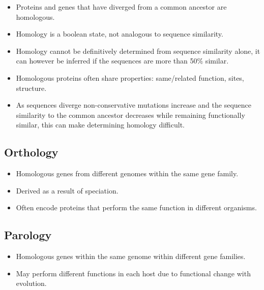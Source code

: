 \documentclass[a4paper]{article}
\begin{document}
\begin{itemize}
  \item
    Proteins and genes that have diverged from a common ancestor are homologous.

  \item
    Homology is a boolean state, not analogous to sequence similarity.

  \item
    Homology cannot be definitively determined from sequence similarity alone,
    it can however be inferred if the sequences are more than 50\% similar.

  \item
    Homologous proteins often share properties: same/related function, sites,
    structure.

  \item
    As sequences diverge non-conservative mutations increase and the sequence
    similarity to the common ancestor decreases while remaining functionally
    similar, this can make determining homology difficult.

\end{itemize}

\subsection{Orthology}

\begin{itemize}
  \item
    Homologous genes from different genomes within the same gene family.

  \item
    Derived as a result of speciation.

  \item
    Often encode proteins that perform the same function in different organisms.

\end{itemize}

\subsection{Parology}

\begin{itemize}
  \item
    Homologous genes within the same genome within different gene families.

  \item
    May perform different functions in each host due to functional change with
    evolution.
\end{itemize}
\end{document}
